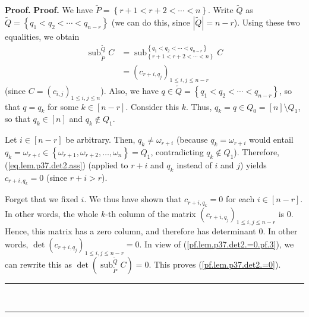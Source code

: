 \documentclass[numbers=enddot,12pt,final,onecolumn,notitlepage]{scrartcl}%
\theoremstyle{definition}
\newenvironment{proof}[1][Proof]{\noindent\textbf{#1.} }{\ \rule{0.5em}{0.5em}}
\begin{document}
\begin{enumerate}
\begin{proof}
\begin{proof}
We have $\widetilde{P}=\left\{  r+1<r+2<\cdots<n\right\}  $. Write
$\widetilde{Q}$ as $\widetilde{Q}=\left\{  q_{1}<q_{2}<\cdots<q_{n-r}\right\}
$ (we can do this, since $\left\vert \widetilde{Q}\right\vert =n-r$). Using
these two equalities, we obtain%
\begin{align}
\operatorname*{sub}\nolimits_{\widetilde{P}}^{\widetilde{Q}}C  &
=\operatorname*{sub}\nolimits_{\left\{  r+1<r+2<\cdots<n\right\}  }^{\left\{
q_{1}<q_{2}<\cdots<q_{n-r}\right\}  }C\nonumber\\
&  =\left(  c_{r+i,q_{j}}\right)  _{1\leq i,j\leq n-r}
\label{pf.lem.p37.det2.=0.pf.3}%
\end{align}
(since $C=\left(  c_{i,j}\right)  _{1\leq i,j\leq n}$). Also, we have
$q\in\widetilde{Q}=\left\{  q_{1}<q_{2}<\cdots<q_{n-r}\right\}  $, so that
$q=q_{k}$ for some $k\in\left[  n-r\right]  $. Consider this $k$. Thus,
$q_{k}=q\in Q_{0}=\left[  n\right]  \setminus Q_{1}$, so that $q_{k}\in\left[
n\right]  $ and $q_{k}\notin Q_{1}$.

Let $i\in\left[  n-r\right]  $ be arbitrary. Then, $q_{k}\neq\omega_{r+i}$
(because $q_{k}=\omega_{r+i}$ would entail $q_{k}=\omega_{r+i}\in\left\{
\omega_{r+1},\omega_{r+2},\ldots,\omega_{n}\right\}  =Q_{1}$, contradicting
$q_{k}\notin Q_{1}$). Therefore, (\ref{eq.lem.p37.det2.ass}) (applied to $r+i$
and $q_{k}$ instead of $i$ and $j$) yields $c_{r+i,q_{k}}=0$ (since $r+i>r$).

Forget that we fixed $i$. We thus have shown that $c_{r+i,q_{k}}=0$ for each
$i\in\left[  n-r\right]  $. In other words, the whole $k$-th column of the
matrix $\left(  c_{r+i,q_{j}}\right)  _{1\leq i,j\leq n-r}$ is $0$. Hence,
this matrix has a zero column, and therefore has determinant $0$. In other
words, $\det\left(  c_{r+i,q_{j}}\right)  _{1\leq i,j\leq n-r}=0$. In view of
(\ref{pf.lem.p37.det2.=0.pf.3}), we can rewrite this as $\det\left(
\operatorname*{sub}\nolimits_{\widetilde{P}}^{\widetilde{Q}}C\right)  =0$.
This proves (\ref{pf.lem.p37.det2.=0}).
\end{proof}


\end{proof}
\end{enumerate}
\end{document}

